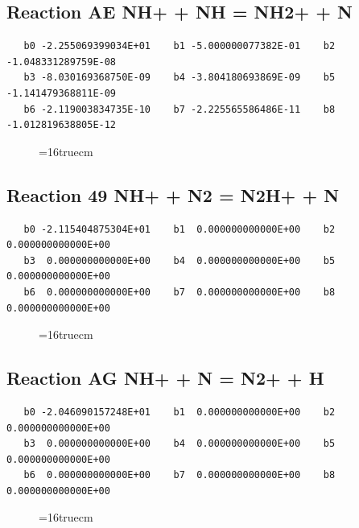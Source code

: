 \documentclass[12pt,dvipdfm]{article}
\begin{document}
\subsection{
Reaction AE NH+ + NH = NH2+ + N}
\begin{small}\begin{verbatim}
   b0 -2.255069399034E+01    b1 -5.000000077382E-01    b2 -1.048331289759E-08
   b3 -8.030169368750E-09    b4 -3.804180693869E-09    b5 -1.141479368811E-09
   b6 -2.119003834735E-10    b7 -2.225565586486E-11    b8 -1.012819638805E-12
   \end{verbatim}\end{small}
\begin{figure}[h!]
\label{n2rates}
\epsfxsize=16truecm
\end{figure}
\newpage

\subsection{
Reaction 49 NH+ + N2 = N2H+ + N}
\begin{small}\begin{verbatim}
   b0 -2.115404875304E+01    b1  0.000000000000E+00    b2  0.000000000000E+00
   b3  0.000000000000E+00    b4  0.000000000000E+00    b5  0.000000000000E+00
   b6  0.000000000000E+00    b7  0.000000000000E+00    b8  0.000000000000E+00
   \end{verbatim}\end{small}
\begin{figure}[h!]
\label{n2rates}
\epsfxsize=16truecm
\end{figure}
\newpage

\subsection{
Reaction AG NH+ + N = N2+ + H}
\begin{small}\begin{verbatim}
   b0 -2.046090157248E+01    b1  0.000000000000E+00    b2  0.000000000000E+00
   b3  0.000000000000E+00    b4  0.000000000000E+00    b5  0.000000000000E+00
   b6  0.000000000000E+00    b7  0.000000000000E+00    b8  0.000000000000E+00
   \end{verbatim}\end{small}
\begin{figure}[h!]
\label{n2rates}
\epsfxsize=16truecm
\end{figure}
\newpage
\end{document}
